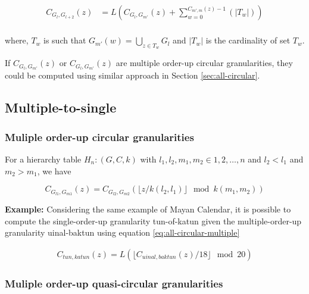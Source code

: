 \documentclass[12pt]{article}
\begin{document}
\begin{equation} \label{eq:multifromsingle-quasi2}
\begin{split}
C_{G_l,G_{l+2}}(z) & = L(C_{G_{l},G_{m'}}(z) + \sum_{w=0}^{C_{m',m}(z) -1}(\vert T_{w} \vert))\\
\end{split}
\end{equation}

where, \(T_w\) is such that \(G_{m'}(w) = \bigcup_{z \in T_w}G_{l}\) and \(\vert T_w \vert\) is the cardinality of set \(T_w\).

If \(C_{G_{l},G_{m'}}(z)\) or \(C_{G_{l},G_{m'}}(z)\) are multiple order-up circular granularities, they could be computed using similar approach in Section \ref{sec:all-circular}.

\hypertarget{sec:multiple-to-single}{%
\subsection{Multiple-to-single}\label{sec:multiple-to-single}}

\hypertarget{sec:all-circular-multiple}{%
\subsubsection{Muliple order-up circular granularities}\label{sec:all-circular-multiple}}

For a hierarchy table \(H_n: (G, C, k)\) with \(l_1, l_2, m_1, m_2 \in {1, 2, \dots, n}\) and \(l_2<l_1\) and \(m_2>m_1\), we have

\begin{equation} \label{eq:all-circular-multiple}
C_{G_{l1}, G_{m1}}(z) = C_{G_{l2}, G_{m2}}(\lfloor z/k(l_2,l_1) \rfloor\mod k(m_1, m_2))
\end{equation}

\textbf{Example:} Considering the same example of Mayan Calendar, it is possible to compute the single-order-up granularity tun-of-katun given the multiple-order-up granularity uinal-baktun using equation \ref{eq:all-circular-multiple}

\begin{equation} \label{eq10}
\begin{split}
C_{tun, katun}(z) =  L(\lfloor C_{uinal, baktun}(z)/18\rfloor \mod 20)
\end{split}
\end{equation}

\hypertarget{sec:quasi-circular-multiple}{%
\subsubsection{Muliple order-up quasi-circular granularities}\label{sec:quasi-circular-multiple}}
\end{document}
